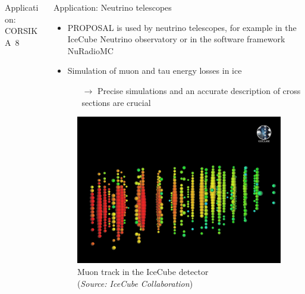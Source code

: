 \documentclass[t]{beamer}
\newlength{\thirdtextwidth}
\newlength{\itemseparation}
\begin{document}
\begin{columns}[onlytextwidth]
\begin{column}{\thirdtextwidth}
\begin{block}[equal height group=B]{Application: CORSIKA~8}

      \end{block}%
    \end{column}%
    \begin{column}{\thirdtextwidth}%
      \begin{block}[equal height group=B]{Application: Neutrino telescopes}%
        \begin{itemize}
          \setlength\itemsep{\itemseparation}
          \item PROPOSAL is used by neutrino telescopes, for example in the IceCube Neutrino observatory or in the software framework NuRadioMC
          \item Simulation of muon and tau energy losses in ice
          \begin{itemize}
            \setlength\itemsep{\itemseparation}
            \item[$\rightarrow$] Precise simulations and an accurate description of cross sections are crucial
          \end{itemize}
        \end{itemize}

        \vspace{1.75em}

        \begin{figure}
          \centering
          \includegraphics[width=0.7\linewidth, height=.4\textheight, keepaspectratio]{plots/icecube_muon.jpg}
          \caption*{Muon track in the IceCube detector \\(\emph{Source: IceCube Collaboration})}
        \end{figure}


\end{block}
\end{column}
\end{columns}
\end{document}
